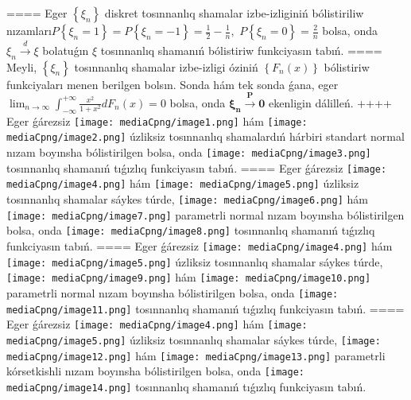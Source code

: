 ====
Eger \(\left\{ \xi_{n} \right\}\) diskret tosınnanlıq shamalar izbe-izliginiń bólistiriliw nızamları\(P\left\{ \xi_{n} = 1 \right\} = P\left\{ \xi_{n} = - 1 \right\} = \frac{1}{2} - \frac{1}{n},\) \(P\left\{ \xi_{n} = 0 \right\} = \frac{2}{n}\) bolsa, onda \(\xi_{n}\overset{d}{\rightarrow}\xi\) bolatuǵın \(\xi\) tosınnanlıq shamanıń bólistiriw funkciyasın tabıń.
====
Meyli, \(\left\{ \xi_{n} \right\}\) tosınnanlıq shamalar izbe-izligi óziniń \(\left\{ F_{n}(x) \right\}\) bólistiriw funkciyaları menen berilgen bolsın. Sonda hám tek sonda ǵana, eger \(\lim_{n \rightarrow \infty}\int_{- \infty}^{+ \infty}{\frac{x^{2}}{1 + x^{2}}dF_{n}(x)} = 0\) bolsa, onda \(\mathbf{\xi}_{\mathbf{n}}\overset{\mathbf{P}}{\rightarrow}\mathbf{0}\) ekenligin dálilleń.
++++
Eger ǵárezsiz \texttt{[image: mediaCpng/image1.png]} hám \texttt{[image: mediaCpng/image2.png]} úzliksiz tosınnanlıq shamalardıń hárbiri standart normal nızam boyınsha bólistirilgen bolsa, onda \texttt{[image: mediaCpng/image3.png]} tosınnanlıq shamanıń tıǵızlıq funkciyasın tabıń.
====
Eger ǵárezsiz \texttt{[image: mediaCpng/image4.png]} hám \texttt{[image: mediaCpng/image5.png]} úzliksiz tosınnanlıq shamalar sáykes túrde, \texttt{[image: mediaCpng/image6.png]} hám \texttt{[image: mediaCpng/image7.png]} parametrli normal nızam boyınsha bólistirilgen bolsa, onda \texttt{[image: mediaCpng/image8.png]} tosınnanlıq shamanıń tıǵızlıq funkciyasın tabıń.
====
Eger ǵárezsiz \texttt{[image: mediaCpng/image4.png]} hám \texttt{[image: mediaCpng/image5.png]} úzliksiz tosınnanlıq shamalar sáykes túrde, \texttt{[image: mediaCpng/image9.png]} hám \texttt{[image: mediaCpng/image10.png]} parametrli normal nızam boyınsha bólistirilgen bolsa, onda \texttt{[image: mediaCpng/image11.png]} tosınnanlıq shamanıń tıǵızlıq funkciyasın tabıń.
====
Eger ǵárezsiz \texttt{[image: mediaCpng/image4.png]} hám \texttt{[image: mediaCpng/image5.png]} úzliksiz tosınnanlıq shamalar sáykes túrde, \texttt{[image: mediaCpng/image12.png]} hám \texttt{[image: mediaCpng/image13.png]} parametrli kórsetkishli nızam boyınsha bólistirilgen bolsa, onda \texttt{[image: mediaCpng/image14.png]} tosınnanlıq shamanıń tıǵızlıq funkciyasın tabıń.

